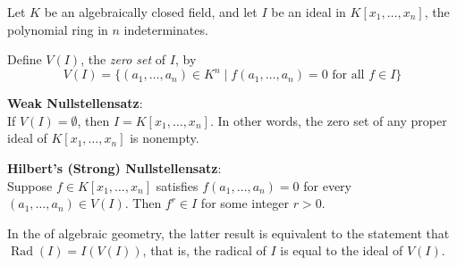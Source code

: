 \documentclass[12pt]{article}
\begin{document}
Let $K$ be an algebraically closed field, and let $I$ be an ideal in $K[x_1,\ldots,x_n]$, the polynomial ring in $n$ indeterminates.

Define $V(I)$, the {\em zero set} of $I$, by 
\[ V(I) = \{(a_1,\ldots,a_n) \in K^n \mid f(a_1,\ldots,a_n)=0 \text{ for all } f \in I\}\]

{\bf Weak Nullstellensatz}:\\
If $V(I)=\emptyset$, then $I=K[x_1,\ldots,x_n]$.  In other words, the zero set of any proper ideal of $K[x_1,\ldots,x_n]$ is nonempty.

{\bf Hilbert's (Strong) Nullstellensatz}:\\
Suppose $f \in K[x_1,\ldots,x_n]$ satisfies $f(a_1,\ldots,a_n)=0$ for every $(a_1,\ldots,a_n) \in V(I)$.  Then $f^r \in I$ for some integer $r>0$.

In the  of algebraic geometry, the latter result is equivalent to the statement that $\operatorname{Rad}(I)=I(V(I))$, that is, the radical of $I$ is equal to the ideal of $V(I)$.
\end{document}
